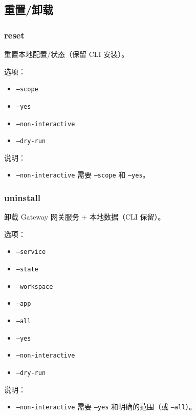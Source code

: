 \subsection{重置/卸载}


\subsubsection{reset}


重置本地配置/状态（保留 CLI 安装）。

选项：

\begin{itemize}
  \item \texttt{--scope }
  \item \texttt{--yes}
  \item \texttt{--non-interactive}
  \item \texttt{--dry-run}
\end{itemize}


说明：

\begin{itemize}
  \item \texttt{--non-interactive} 需要 \texttt{--scope} 和 \texttt{--yes}。
\end{itemize}


\subsubsection{uninstall}


卸载 Gateway 网关服务 + 本地数据（CLI 保留）。

选项：

\begin{itemize}
  \item \texttt{--service}
  \item \texttt{--state}
  \item \texttt{--workspace}
  \item \texttt{--app}
  \item \texttt{--all}
  \item \texttt{--yes}
  \item \texttt{--non-interactive}
  \item \texttt{--dry-run}
\end{itemize}


说明：

\begin{itemize}
  \item \texttt{--non-interactive} 需要 \texttt{--yes} 和明确的范围（或 \texttt{--all}）。
\end{itemize}


